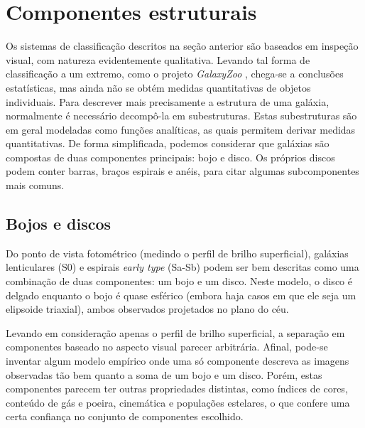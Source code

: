 
\section{Componentes estruturais}

Os sistemas de classificação descritos na seção anterior são baseados em
inspeção visual, com natureza evidentemente qualitativa. Levando tal forma de
classificação a um extremo, como o projeto {\em GalaxyZoo} \citep{Lintott2008,
Willett2013}, chega-se a conclusões estatísticas, mas ainda não se obtém medidas
quantitativas de objetos individuais. Para descrever mais precisamente a
estrutura de uma galáxia, normalmente é necessário decompô-la em subestruturas.
Estas subestruturas são em geral modeladas como funções analíticas, as quais
permitem derivar medidas quantitativas. De forma simplificada, podemos
considerar que galáxias são compostas de duas componentes principais: bojo e
disco. Os próprios discos podem conter barras, braços espirais e anéis, para
citar algumas subcomponentes mais comuns.


\subsection{Bojos e discos}
\label{sec:morph:comp:bd}

Do ponto de vista fotométrico (medindo o perfil de brilho superficial), galáxias
lenticulares (S0) e espirais {\em early type} (Sa-Sb) podem ser bem descritas
como uma combinação de duas componentes: um bojo e um disco. Neste modelo, o
disco é delgado enquanto o bojo é quase esférico (embora haja casos em que ele
seja um elipsoide triaxial), ambos observados projetados no plano do céu.

Levando em consideração apenas o perfil de brilho superficial, a separação em
componentes baseado no aspecto visual parecer arbitrária. Afinal, pode-se
inventar algum modelo empírico onde uma só componente descreva as imagens
observadas tão bem quanto a soma de um bojo e um disco. Porém, estas componentes
parecem ter outras propriedades distintas, como índices de cores, conteúdo de
gás e poeira, cinemática e populações estelares, o que confere uma certa
confiança no conjunto de componentes escolhido.

